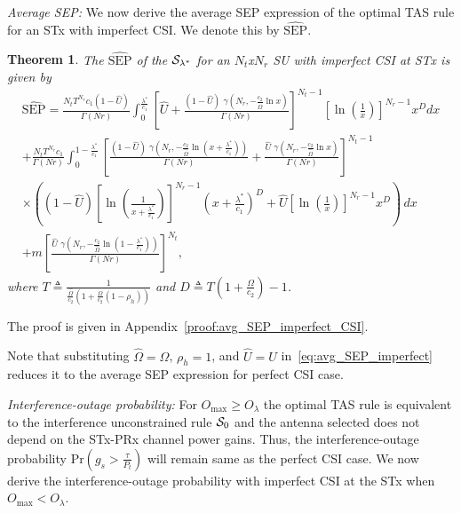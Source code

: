 \documentclass[12pt,draftcls,peerreview,onecolumn]{IEEEtran}
\newtheorem{theorem}{{\bf Theorem}}
\newcommand{\brac}[1]{\left({#1}\right)}
\newcommand{\define}{\triangleq}
\newcommand{\prob}[1]{\text{Pr}\brac{#1}}
\newcommand{\SEP}{\text{SEP}}
\newcommand{\lam}{\lambda}
\newcommand{\lamstar}{\lam^{*}}
\newcommand{\Nt}{{N_t}}
\newcommand{\Nr}{{N_r}}
\newcommand{\Pt}{{P_t}}
\newcommand{\puch}{g}
\newcommand{\gk}[1]{{\puch_{#1}}}
\newcommand{\outmax}{O_{\text{max}}}
\newcommand{\itau}{\tau}
\newcommand{\cone}{c_{1}}
\newcommand{\ctwo}{c_{2}}
\newcommand{\out}{O}
\newcommand{\m}{\cone}
\newcommand{\taubypt}{\frac{\itau}{\Pt}}
\newcommand{\gkgrtaubypt}[1]{{\gk{#1}}>\taubypt}
\newcommand{\lamstarbym}{\frac{\lamstar}{\m}}
\newcommand{\al}{\ctwo}
\newcommand{\snr}{\Omega}
\newcommand{\albysnr}[1][]{\frac{\al#1}{\snr}}
\newcommand{\snrbyal}[1][]{\frac{\snr#1}{\al}}
\newcommand{\un}{U}
\newcommand{\caluncons}{{\cal S_{\text{0}}}}
\newcommand{\outlam}{\out_{\lam}}
\newcommand{\callamstarrule}{\cal S_{\lam^{*}}}
\newcommand{\unhat}{\widehat{\un}}
\newcommand{\snrhat}{\widehat{\snr}}
\newcommand{\albysnrhat}[1][]{\frac{\al#1}{\snrhat}}
\newcommand{\snrhatbyal}[1][]{\frac{\snrhat#1}{\al}}
\newcommand{\rhoh}{\rho_h}
\newcommand{\Tc}{\frac{1}{\snrhatbyal\left(1 + \snrbyal\left(1 - \rhoh \right)  \right) }}
\newcommand{\T}{T}
\newcommand{\Dc}{\T \left( 1 + \snrbyal\right) -1}
\begin{document}
\newcommand{\pdfyhatNr}{\left(\ln\left(\frac{1}{x}\right)\right)^{\Nr-1}x^{\albysnr[]-1}} %
\newcommand{\yhattimespdfyNr}{\left[\ln\left(\frac{1}{x}\right)\right]^{\Nr-1}x^{D}} %
\newcommand{\yhatpluslamstartimespdfyNr}{\left[\ln\left(\frac{1}{x+\lamstarbym}\right)\right]^{\Nr-1}\left(x+\lamstarbym\right)^{D}} %
\newcommand{\unccdfyhat}[2]{\frac{{#1}\,\,\gamma\left(\Nr,-\albysnrhat\ln{#2}\right)}{\Gamma\left(Nr\right)}}


\newcommand{\avgSEPhat}{\widehat{\SEP}}

{\em Average SEP:} We now derive the average SEP expression of the optimal TAS rule for an  STx with imperfect CSI. We denote this by $\avgSEPhat$. 

\begin{theorem}
\label{thm:avg_SEP_imperfect}
The $\avgSEPhat$ of the $\callamstarrule$ for an  $\Nt$x$\Nr$ SU with imperfect CSI at STx is given by
\begin{multline}
\label{eq:avg_SEP_imperfect}
\avgSEPhat = \frac{\Nt \T^{\Nr}\m(1-\unhat)}{\Gamma(Nr)}\int_{0}^{\lamstarbym} \left[\unhat + \unccdfyhat{(1-\unhat)}{x}\right]^{\Nt-1} \yhattimespdfyNr dx\\
+ \frac{\Nt \T^{\Nr}\m}{\Gamma(Nr)} \int_{0}^{1-\lamstarbym}
\left[\unccdfyhat{(1-\unhat)}{\left(x+\lamstarbym\right)} + \unccdfyhat{\unhat}{x}\right]^{\Nt-1}\\
\times\left((1-\unhat)\yhatpluslamstartimespdfyNr+\unhat\yhattimespdfyNr\right)\, dx\\
+m\left[\unccdfyhat{\unhat}{\left(1-\lamstarbym\right)}\right]^{\Nt},
\end{multline}
where $\T \define \Tc$ and $D \define \Dc$.	
\end{theorem}
\begin{IEEEproof}
	The proof is given in Appendix~\ref{proof:avg_SEP_imperfect_CSI}.
\end{IEEEproof}
Note that substituting $\snrhat=\snr$, $\rhoh=1$, and $\unhat=\un$ in~\eqref{eq:avg_SEP_imperfect} reduces it to the average SEP expression for perfect CSI case.



{\em Interference-outage probability:} For $\outmax \geq \outlam$ the optimal TAS rule is equivalent to the interference unconstrained rule $\caluncons$ and the antenna selected does not depend on the  STx-PRx channel power gains. Thus, the interference-outage probability $\prob{\gkgrtaubypt{s}}$ will remain same as the perfect CSI case. We now derive the interference-outage probability with imperfect CSI at the STx when $\outmax < \outlam$.
\end{document}
